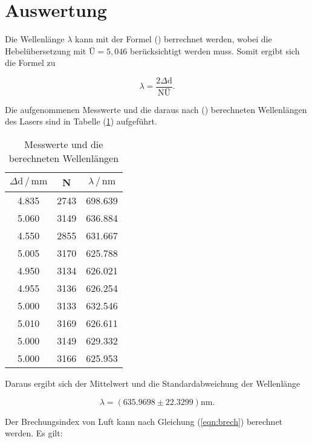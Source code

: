 \newpage
\section{Auswertung}
Die Wellenlänge $\lambda$ kann mit der Formel (\label{eqn:d1}) berrechnet werden, 
wobei die Hebelübersetzung mit $\text{Ü}=5,046$ berücksichtigt werden muss.
Somit ergibt sich die Formel zu

\begin{equation}
\lambda=\frac{2 \Delta \text{d}}{ \text{NÜ}} .
\label{eqn:lam}
\end{equation}

\noindent
Die aufgenommenen Messwerte und die daraus nach (\label{eqn:lam}) berechneten Wellenlängen des Lasers sind in Tabelle (\ref{tab:lam}) aufgeführt.

\begin{table}
    \centering
    \caption{Messwerte und die berechneten Wellenlängen}
    \label{tab:lam}
    \begin{tabular}{c c c}
    \toprule
    $ \Delta \text{d} \,/\, \si{\milli\meter} $ & N & $\lambda \,/\, \si{\nano\meter}$\\
    \midrule 
   
    4.835  & 2743 &  698.639 \\
    5.060  & 3149 &  636.884 \\
    4.550  & 2855 &  631.667 \\
    5.005  & 3170 &  625.788 \\
    4.950  & 3134 &  626.021 \\
    4.955  & 3136 &  626.254 \\
    5.000  & 3133 &  632.546 \\
    5.010  & 3169 &  626.611 \\
    5.000  & 3149 &  629.332 \\
    5.000  & 3166 &  625.953 \\

    \bottomrule
    \end{tabular}
  \end{table}

\noindent
Daraus ergibt sich der Mittelwert und die Standardabweichung der Wellenlänge

\begin{equation*}
\lambda = (635.9698 \pm 22.3299) \si{\nano\meter}.
\end{equation*}

\noindent
Der Brechungsindex von Luft kann nach Gleichung (\ref{eqn:brech}) berechnet werden.
Es gilt:

